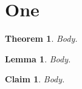 \documentclass{article}
\newtheorem{theorem}{Theorem}[\relax]
\newtheorem{lemma}[\relax]{Lemma}
\newtheorem{claim}[\relax]{Claim}[section]
\begin{document}
\section{One}
\begin{theorem}Body.\end{theorem}
\begin{lemma}Body.\end{lemma}
\begin{claim}Body.\end{claim}
\end{document}
